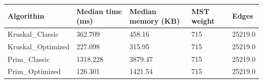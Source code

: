 \begin{tabular}{lllll}
\toprule
Algorithm & Median time (ms) & Median memory (KB) & MST weight & Edges \\
\midrule
Kruskal\_Classic & 362.709 & 458.16 & 715 & 25219.0 \\
Kruskal\_Optimized & 227.098 & 315.95 & 715 & 25219.0 \\
Prim\_Classic & 1318.228 & 3879.47 & 715 & 25219.0 \\
Prim\_Optimized & 126.301 & 1421.54 & 715 & 25219.0 \\
\bottomrule
\end{tabular}
